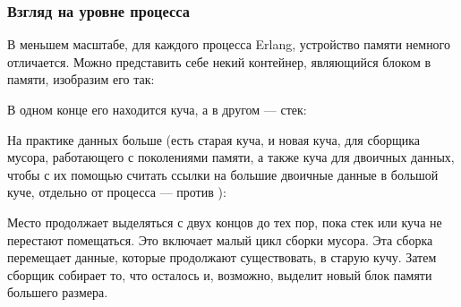 \subsubsection{Взгляд на уровне процесса}
\label{subsec:memory-process-level}

В меньшем масштабе, для каждого процесса Erlang, устройство памяти немного отличается. Можно представить себе некий контейнер, являющийся блоком в памяти, изобразим его так:

\begin{VerbatimText}
[                  ]
\end{VerbatimText}

В одном конце его находится куча, а в другом --- стек:

\begin{VerbatimText}
\end{VerbatimText}

На практике данных больше (есть старая куча, и новая куча, для сборщика мусора, работающего с поколениями памяти, а также куча для двоичных данных, чтобы с их помощью считать ссылки на большие двоичные данные в большой куче, отдельно от процесса ---  против ):

\begin{VerbatimText}
\end{VerbatimText}

Место продолжает выделяться с двух концов до тех пор, пока стек или куча не перестают помещаться. Это включает малый цикл сборки мусора. Эта сборка перемещает данные, которые продолжают существовать, в старую кучу. Затем сборщик собирает то, что осталось и, возможно, выделит новый блок памяти большего размера.

